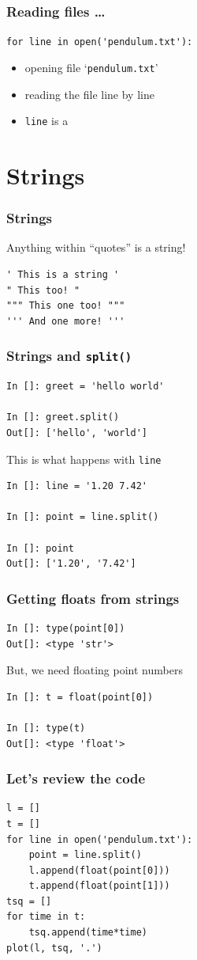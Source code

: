 \documentclass[14pt,compress]{beamer}
\newcounter{time}
\newcommand{\typ}[1]{\lstinline{#1}}
\newcommand{\kwrd}[1]{ \texttt{\textbf{\color{blue}{#1}}}  }
\begin{document}
\begin{frame}[fragile]
  \frametitle{Reading files \ldots}
\typ{for line in open('pendulum.txt'):}
\begin{itemize}
\item opening file `\typ{pendulum.txt}'
\item reading the file line by line
\item \typ{line} is a \kwrd{string}
\end{itemize}
\end{frame}

\section{Strings}
\begin{frame}[fragile]
\frametitle{Strings}
Anything within ``quotes'' is a string!
\begin{lstlisting}
' This is a string '  
" This too! "
""" This one too! """
''' And one more! '''
\end{lstlisting}
\end{frame}

\begin{frame}[fragile]
\frametitle{Strings and \typ{split()}}
  \begin{lstlisting}
In []: greet = 'hello world'

In []: greet.split()
Out[]: ['hello', 'world']
  \end{lstlisting}
This is what happens with \typ{line}
  \begin{lstlisting}
In []: line = '1.20 7.42'

In []: point = line.split()

In []: point
Out[]: ['1.20', '7.42']
  \end{lstlisting}
\end{frame}

\begin{frame}[fragile]
\frametitle{Getting floats from strings}
  \begin{lstlisting}
In []: type(point[0])
Out[]: <type 'str'>
  \end{lstlisting}
But, we need floating point numbers
  \begin{lstlisting}
In []: t = float(point[0])

In []: type(t)
Out[]: <type 'float'>
  \end{lstlisting}
\end{frame}

\begin{frame}[fragile]
\frametitle{Let's review the code}
\begin{lstlisting}
l = []
t = []
for line in open('pendulum.txt'):
    point = line.split()
    l.append(float(point[0]))
    t.append(float(point[1]))
tsq = []
for time in t:
    tsq.append(time*time)
plot(l, tsq, '.')
\end{lstlisting}
\end{frame}
\end{document}
